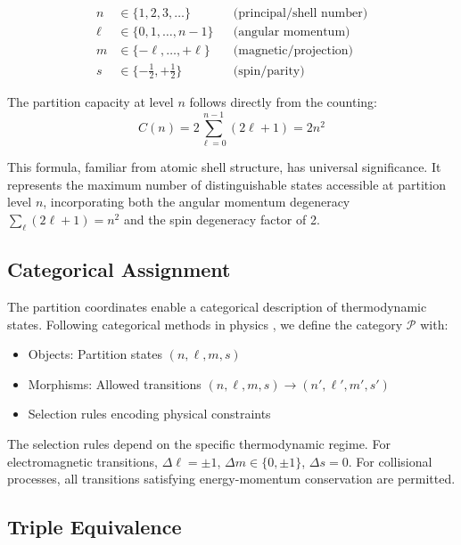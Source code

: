 \documentclass[twocolumn,aps,prd,superscriptaddress,nofootinbib]{revtex4-2}
\begin{document}
\begin{align}
n &\in \{1, 2, 3, \ldots\} & &\text{(principal/shell number)} \\
\ell &\in \{0, 1, \ldots, n-1\} & &\text{(angular momentum)} \\
m &\in \{-\ell, \ldots, +\ell\} & &\text{(magnetic/projection)} \\
s &\in \{-\tfrac{1}{2}, +\tfrac{1}{2}\} & &\text{(spin/parity)}
\end{align}

The partition capacity at level $n$ follows directly from the counting:
\begin{equation}
C(n) = 2\sum_{\ell=0}^{n-1}(2\ell + 1) = 2n^2
\label{eq:capacity}
\end{equation}

This formula, familiar from atomic shell structure, has universal significance. It represents the maximum number of distinguishable states accessible at partition level $n$, incorporating both the angular momentum degeneracy $\sum_{\ell}(2\ell+1) = n^2$ and the spin degeneracy factor of 2.

\subsection{Categorical Assignment}

The partition coordinates enable a categorical description of thermodynamic states. Following categorical methods in physics \cite{coecke2017picturing, baez2010physics}, we define the category $\mathcal{P}$ with:
\begin{itemize}
    \item Objects: Partition states $(n, \ell, m, s)$
    \item Morphisms: Allowed transitions $(n, \ell, m, s) \to (n', \ell', m', s')$
    \item Selection rules encoding physical constraints
\end{itemize}

The selection rules depend on the specific thermodynamic regime. For electromagnetic transitions, $\Delta\ell = \pm 1$, $\Delta m \in \{0, \pm 1\}$, $\Delta s = 0$. For collisional processes, all transitions satisfying energy-momentum conservation are permitted.

\subsection{Triple Equivalence}
\end{document}
